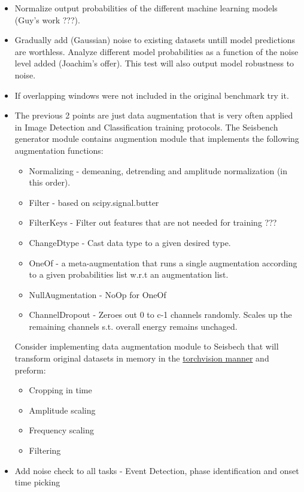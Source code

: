 \documentclass[11pt,a4paper]{article}
\begin{document}
\begin{itemize}
\item Normalize output probabilities of the different machine learning models (Guy's work ???).
\item Gradually add (Gaussian) noise to existing datasets untill model predictions are worthless. Analyze different model probabilities as a function of the noise level added (Joachim's offer). This test will also output model robustness to noise.
\item If overlapping windows were not included in the original benchmark try it. 
\item The previous 2 points are just data augmentation that is very often applied in Image Detection and Classification training protocols. The Seisbench generator module contains augmention module that implements the following augmentation functions:
\begin{itemize}
\item Normalizing - demeaning, detrending and amplitude normalization (in this order).
\item Filter -  based on scipy.signal.butter
\item FilterKeys - Filter out features that are not needed for training ???
\item ChangeDtype - Cast data type to a given desired type.
\item OneOf - a meta-augmentation that runs a single augmentation according to a given probabilities list w.r.t an augmentation list.
\item NullAugmentation - NoOp for OneOf
\item ChannelDropout - Zeroes out 0 to c-1 channels randomly. Scales up the remaining channels s.t. overall energy remains unchaged.
\end{itemize}

Consider implementing data augmentation module to Seisbech that will transform original datasets  in memory in the \href{https://pytorch.org/vision/main/transforms.html}{torchvision manner} and preform:
\begin{itemize}
\item Cropping in time
\item Amplitude scaling
\item Frequency scaling
\item Filtering
\end{itemize}
\item Add noise check to all tasks - Event Detection, phase identification and onset time picking
\end{itemize}
\end{document}
